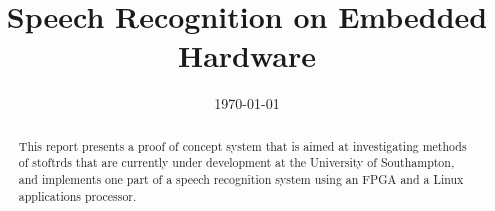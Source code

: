 \documentclass{ecsreport}     			%
\begin{document}
\frontmatter
\title      {Speech Recognition on Embedded Hardware}
\addresses  {\groupname\\\deptname\\\univname}
\date       {\today}
\subject    {}
\keywords   {}
\maketitle
\begin{abstract}  %
This report presents a proof of concept system that is aimed at investigating methods of stoftrds that are currently under development at the University of Southampton, and implements one part of a speech recognition system using an FPGA and a Linux applications processor.
\end{abstract}
\tableofcontents
\mainmatter









%
\backmatter

\end{document}
